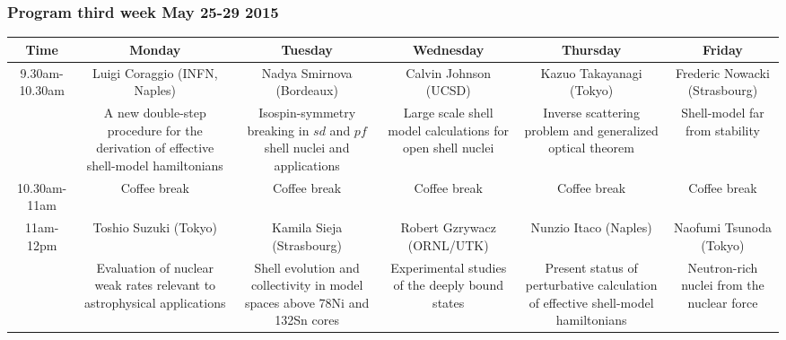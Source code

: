 \documentclass{beamer}
\begin{document}
\begin{frame}
\frametitle{Program third week May 25-29 2015}

\begin{block}{}


{\footnotesize
\begin{tabular}{cccccc}
\hline
\multicolumn{1}{c}{ Time } & \multicolumn{1}{c}{ Monday } & \multicolumn{1}{c}{ Tuesday } & \multicolumn{1}{c}{ Wednesday } & \multicolumn{1}{c}{ Thursday } & \multicolumn{1}{c}{ Friday } \\
\hline
9.30am-10.30am & Luigi Coraggio (INFN, Naples)                                                        & Nadya Smirnova (Bordeaux)                                                   & Calvin Johnson (UCSD)                                      & Kazuo Takayanagi (Tokyo)                                                         & Frederic Nowacki (Strasbourg)              \\
               & A new double-step procedure for the derivation of effective shell-model hamiltonians & Isospin-symmetry breaking in $sd$ and $pf$ shell nuclei and applications    & Large scale shell model calculations for open shell nuclei & Inverse scattering problem and generalized optical theorem                       & Shell-model far from stability             \\
\hline
10.30am-11am   & Coffee break                                                                         & Coffee break                                                                & Coffee break                                               & Coffee break                                                                     & Coffee break                               \\
\hline
11am-12pm      & Toshio Suzuki (Tokyo)                                                                & Kamila Sieja (Strasbourg)                                                   & Robert Gzrywacz (ORNL/UTK)                                 & Nunzio Itaco (Naples)                                                            & Naofumi Tsunoda (Tokyo)                    \\
               & Evaluation of nuclear weak rates relevant to astrophysical applications              & Shell evolution and collectivity in model spaces above 78Ni and 132Sn cores & Experimental studies of the deeply bound states            & Present status of perturbative calculation of effective shell-model hamiltonians & Neutron-rich nuclei from the nuclear force \\

\end{tabular}}
\end{block}
\end{frame}
\end{document}

